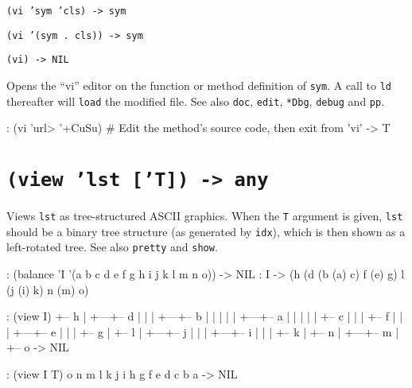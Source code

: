\texttt{(vi 'sym 'cls) -> sym}

\texttt{(vi '(sym . cls)) -> sym}

\texttt{(vi) -> NIL}

Opens the ``vi'' editor on the function or method definition of \texttt{sym}. A
call to \texttt{ld} thereafter will \texttt{load} the modified file. See also \texttt{doc},
\texttt{edit}, \texttt{*Dbg}, \texttt{debug} and \texttt{pp}.


\begin{wideverbatim}
: (vi 'url> '+CuSu)  # Edit the method's source code, then exit from 'vi'
-> T
\end{wideverbatim}

 
\section*{\texttt{(view 'lst ['T]) -> any}}
\label{sec:func-ref-V-(view 'lst ['T]) -> any}


Views \texttt{lst} as tree-structured ASCII graphics. When the \texttt{T} argument is
given, \texttt{lst} should be a binary tree structure (as generated by \texttt{idx}),
which is then shown as a left-rotated tree. See also \texttt{pretty} and
\texttt{show}.


\begin{wideverbatim}
: (balance 'I '(a b c d e f g h i j k l m n o))
-> NIL
: I
-> (h (d (b (a) c) f (e) g) l (j (i) k) n (m) o)

: (view I)
+-- h
|
+---+-- d
|   |
|   +---+-- b
|   |   |
|   |   +---+-- a
|   |   |
|   |   +-- c
|   |
|   +-- f
|   |
|   +---+-- e
|   |
|   +-- g
|
+-- l
|
+---+-- j
|   |
|   +---+-- i
|   |
|   +-- k
|
+-- n
|
+---+-- m
|
+-- o
-> NIL

: (view I T)
         o
      n
         m
   l
         k
      j
         i
h
         g
      f
         e
   d
         c
      b
         a
-> NIL
\end{wideverbatim}

